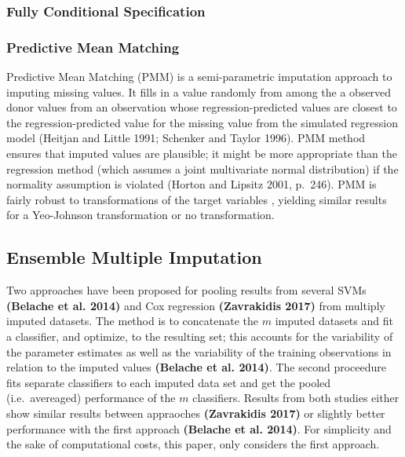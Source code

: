 \documentclass[12pt,]{article}
\begin{document}
\subsubsection{Fully Conditional
Specification}\label{fully-conditional-specification}

\subsubsection{Predictive Mean Matching}\label{predictive-mean-matching}

Predictive Mean Matching (PMM) is a semi-parametric imputation approach
to imputing missing values. It fills in a value randomly from among the
a observed donor values from an observation whose regression-predicted
values are closest to the regression-predicted value for the missing
value from the simulated regression model (Heitjan and Little 1991;
Schenker and Taylor 1996). PMM method ensures that imputed values are
plausible; it might be more appropriate than the regression method
(which assumes a joint multivariate normal distribution) if the
normality assumption is violated (Horton and Lipsitz 2001, p.~246). PMM
is fairly robust to transformations of the target variables
\citep{van_buuren_flexible_2012}, yielding similar results for a
Yeo-Johnson transformation or no transformation.

\subsection{Ensemble Multiple
Imputation}\label{ensemble-multiple-imputation}

Two approaches have been proposed for pooling results from several SVMs
\textbf{(Belache et al. 2014)} and Cox regression \textbf{(Zavrakidis
2017)} from multiply imputed datasets. The method is to concatenate the
\(m\) imputed datasets and fit a classifier, and optimize, to the
resulting set; this accounts for the variability of the parameter
estimates as well as the variability of the training observations in
relation to the imputed values \textbf{(Belache et al. 2014)}. The
second proceedure fits separate classifiers to each imputed data set and
get the pooled (i.e.~avereaged) performance of the \(m\) classifiers.
Results from both studies either show similar results between appraoches
\textbf{(Zavrakidis 2017)} or slightly better performance with the first
approach \textbf{(Belache et al. 2014)}. For simplicity and the sake of
computational costs, this paper, only considers the first approach.
\end{document}
